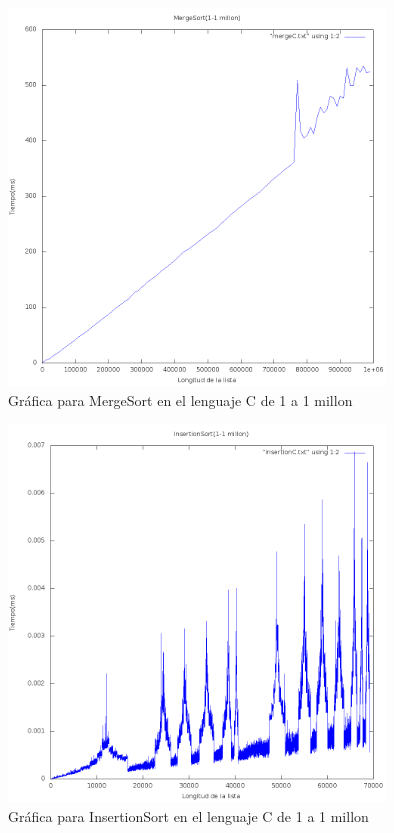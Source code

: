 \documentclass[11 pt, a4paper]{article}
\theoremstyle{definition}
\begin{document}
\begin{enumerate}
       \begin{figure}[H]
         \centering
          \includegraphics[trim=0cm 0cm 0cm 0cm, width=10cm]{1-1mC.png} 
          \caption{Gráfica para MergeSort en el lenguaje C de 1 a 1 millon}
      \end{figure}
       \begin{figure}[H]
         \centering
          \includegraphics[trim=0cm 0cm 0cm 0cm, width=10cm]{1-1mIC.png} 
          \caption{Gráfica para InsertionSort en el lenguaje C de 1 a 1 millon}
      \end{figure}
       \begin{figure}[H]
         \centering

\end{figure}
\end{enumerate}
\end{document}
